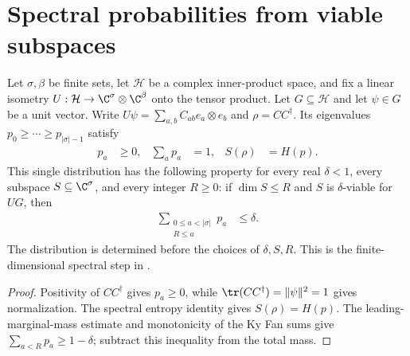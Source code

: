 \section{Spectral probabilities from viable subspaces}

\begin{theorem}
    \label{thm:unit_cut_spectral_probability}
    \leanok
    Let $\sigma,\beta$ be finite sets, let $\mathcal H$ be a complex
    inner-product space, and fix a linear isometry
    $U:\mathcal H\to\C^\sigma\otimes\C^\beta$ onto the tensor product.
    Let $G\subseteq\mathcal H$ and let $\psi\in G$ be a unit vector.
    Write $U\psi=\sum_{a,b}C_{ab}e_a\otimes e_b$ and $\rho=CC^\dagger$.
    Its eigenvalues $p_0\ge\cdots\ge p_{|\sigma|-1}$ satisfy
    \begin{align*}
        p_a&\ge0, & \sum_a p_a&=1, & S(\rho)&=H(p).
    \end{align*}
    This single distribution has the following property for every real
    $\delta<1$, every subspace $S\subseteq\C^\sigma$, and every integer $R\ge0$:
    if $\dim S\le R$ and $S$ is $\delta$-viable for $UG$, then
    \begin{align}
        \sum_{\substack{0\le a<|\sigma|\\R\le a}}p_a&\le\delta.
        \label{eq:unit_cut_spectral_tail}
    \end{align}
    The distribution is determined before the choices of $\delta,S,R$.
    This is the finite-dimensional spectral step in
    \cite[proof of Theorem~4.9]{Arad2016RigorousRG}.
\end{theorem}
\begin{proof}
    \leanok
    Positivity of $CC^\dagger$ gives $p_a\ge0$, while
    $\tr(CC^\dagger)=\|\psi\|^2=1$ gives normalization.
    The spectral entropy identity gives $S(\rho)=H(p)$.
    The leading-marginal-mass estimate and monotonicity of the Ky Fan sums give
    $\sum_{a<R}p_a\ge1-\delta$; subtract this inequality from the total mass.
\end{proof}

